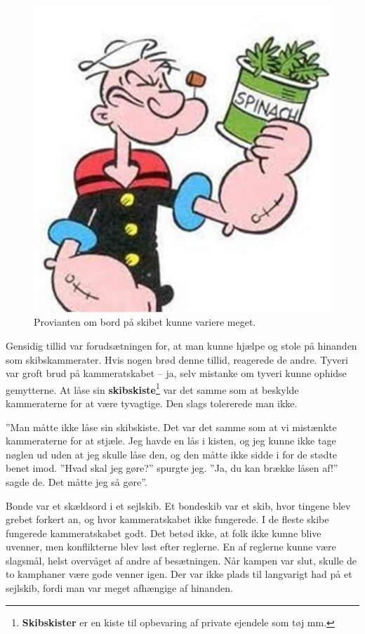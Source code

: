 \begin{figure}
\centering
\includegraphics{images/sejlskibe_tema-3-proviant.jpg}
\caption{Provianten om bord på skibet kunne variere meget.}
\end{figure}

Gensidig tillid var forudsætningen for, at man kunne hjælpe og stole på
hinanden som skibskammerater. Hvis nogen brød denne tillid, reagerede de
andre. Tyveri var groft brud på kammeratskabet -- ja, selv mistanke om
tyveri kunne ophidse gemytterne. At låse sin
\textbf{skibskiste}\footnote{\textbf{Skibskister} er en kiste til
  opbevaring af private ejendele som tøj mm.} var det samme som at
beskylde kammeraterne for at være tyvagtige. Den slags tolererede man
ikke.

''Man måtte ikke låse sin skibskiste. Det var det samme som at vi
mistænkte kammeraterne for at stjæle. Jeg havde en lås i kisten, og jeg
kunne ikke tage nøglen ud uden at jeg skulle låse den, og den måtte ikke
sidde i for de stødte benet imod. ''Hvad skal jeg gøre?'' spurgte jeg.
''Ja, du kan brække låsen af!'' sagde de. Det måtte jeg så gøre''.

Bonde var et skældsord i et sejlskib. Et bondeskib var et skib, hvor
tingene blev grebet forkert an, og hvor kammeratskabet ikke fungerede. I
de fleste skibe fungerede kammeratskabet godt. Det betød ikke, at folk
ikke kunne blive uvenner, men konflikterne blev løst efter reglerne. En
af reglerne kunne være slagsmål, helst overvåget af andre af
besætningen. Når kampen var slut, skulle de to kamphaner være gode
venner igen. Der var ikke plads til langvarigt had på et sejlskib, fordi
man var meget afhængige af hinanden.

